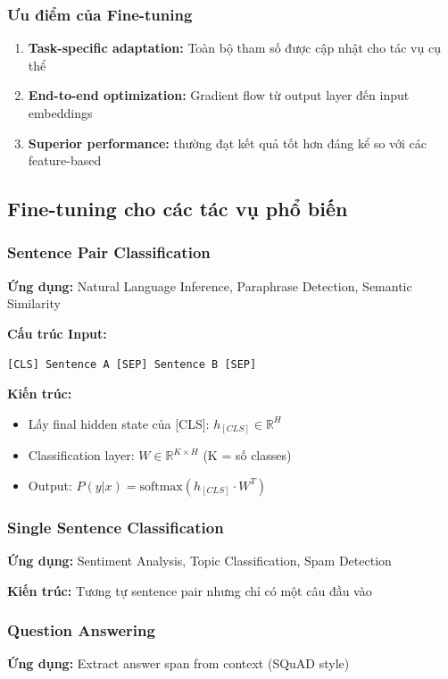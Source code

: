 \subsubsection{Ưu điểm của Fine-tuning}
\begin{enumerate}
    \item \textbf{Task-specific adaptation:} Toàn bộ tham số được cập nhật cho tác vụ cụ thể
    \item \textbf{End-to-end optimization:} Gradient flow từ output layer đến input embeddings
    \item \textbf{Superior performance:} thường đạt kết quả tốt hơn đáng kể so với các feature-based
\end{enumerate}

\subsection{Fine-tuning cho các tác vụ phổ biến}
\label{ssec:vi_du_tinh_chinh}

\subsubsection{Sentence Pair Classification}
\textbf{Ứng dụng:} Natural Language Inference, Paraphrase Detection, Semantic Similarity

\textbf{Cấu trúc Input:}
\begin{verbatim}
[CLS] Sentence A [SEP] Sentence B [SEP]
\end{verbatim}

\textbf{Kiến trúc:}
\begin{itemize}
    \item Lấy final hidden state của [CLS]: $h_{[CLS]} \in \mathbb{R}^H$
    \item Classification layer: $W \in \mathbb{R}^{K \times H}$ (K = số classes)
    \item Output: $P(y|x) = \text{softmax}(h_{[CLS]} \cdot W^T)$
\end{itemize}

\subsubsection{Single Sentence Classification}  
\textbf{Ứng dụng:} Sentiment Analysis, Topic Classification, Spam Detection

\textbf{Kiến trúc:} Tương tự sentence pair nhưng chỉ có một câu đầu vào

\subsubsection{Question Answering}
\textbf{Ứng dụng:} Extract answer span from context (SQuAD style)

